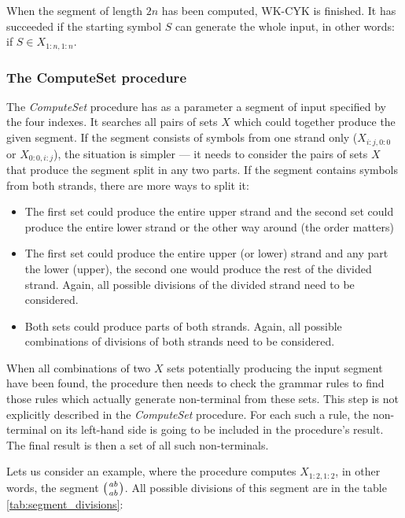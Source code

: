 When the segment of length $2n$ has been computed, WK-CYK is finished. It has succeeded if the starting symbol $S$ can generate the whole input, in other words: if $S \in X_{1:n,1:n}$.

\subsubsection{The ComputeSet procedure}
The \textit{ComputeSet} procedure has as a parameter a segment of input specified by the four indexes. It searches all pairs of sets $X$ which could together produce the given segment. If the segment consists of symbols from one strand only ($X_{i:j,0:0}$ or $X_{0:0,i:j}$), the situation is simpler --- it needs to consider the pairs of sets $X$ that produce the segment split in any two parts. If the segment contains symbols from both strands, there are more ways to split it:

\begin{itemize}
  \item{The first set could produce the entire upper strand and the second set could produce the entire lower strand or the other way around (the order matters)}
  \item{The first set could produce the entire upper (or lower) strand and any part the lower (upper), the second one would produce the rest of the divided strand. Again, all possible divisions of the divided strand need to be considered.}
  \item{Both sets could produce parts of both strands. Again, all possible combinations of divisions of both strands need to be considered.}
\end{itemize}

When all combinations of two $X$ sets potentially producing the input segment have been found, the procedure then needs to check the grammar rules to find those rules which actually generate non-terminal from these sets. This step is not explicitly described in the \textit{ComputeSet} procedure. For each such a rule, the non-terminal on its left-hand side is going to be included in the procedure's result. The final result is then a set of all such non-terminals.

Lets us consider an example, where the procedure computes $X_{1:2,1:2}$, in other words, the segment $\wkpair{ab}{ab}$. All possible divisions of this segment are in the table \ref{tab:segment_divisions}:


